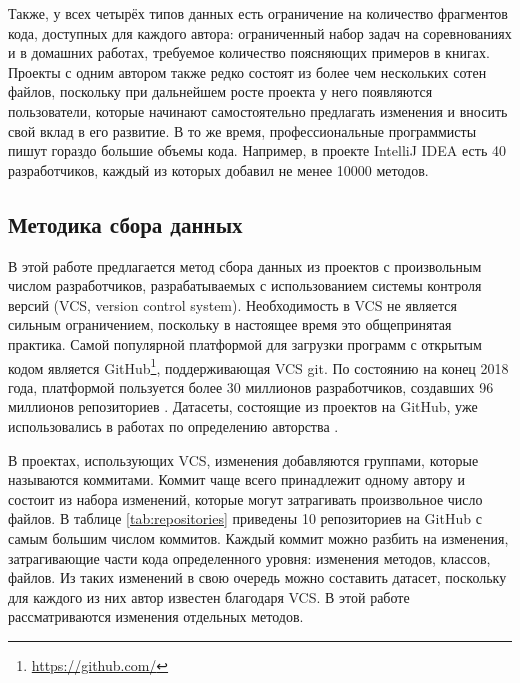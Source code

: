 Также, у всех четырёх типов данных есть ограничение на количество фрагментов кода, доступных для каждого автора: ограниченный набор задач на соревнованиях и в домашних работах, требуемое количество поясняющих примеров в книгах. Проекты с одним автором также редко состоят из более чем нескольких сотен файлов, поскольку при дальнейшем росте проекта у него появляются пользователи, которые начинают самостоятельно предлагать изменения и вносить свой вклад в его развитие. В то же время, профессиональные программисты пишут гораздо большие объемы кода. Например, в проекте IntelliJ IDEA есть 40 разработчиков, каждый из которых добавил не менее 10000 методов.

\subsection{Методика сбора данных}
В этой работе предлагается метод сбора данных из проектов с произвольным числом разработчиков, разрабатываемых с использованием системы контроля версий (VCS, version control system). Необходимость в VCS не является сильным ограничением, поскольку в настоящее время это общепринятая практика. Самой популярной платформой для загрузки программ с открытым кодом является GitHub\footnote{\url{https://github.com/}}, поддерживающая VCS git. По состоянию на конец 2018 года, платформой пользуется более 30 миллионов разработчиков, создавших 96 миллионов репозиториев \cite{GithubStats}. Датасеты, состоящие из проектов на GitHub, уже использовались в работах по определению авторства \cite{Wisse2015,Yang2017,Alsulami2017,Zhang2017}.

В проектах, использующих VCS, изменения добавляются группами, которые называются коммитами. Коммит чаще всего принадлежит одному автору и состоит из набора изменений, которые могут затрагивать произвольное число файлов. В таблице \ref{tab:repositories} приведены 10 репозиториев на GitHub с самым большим числом коммитов. Каждый коммит можно разбить на изменения, затрагивающие части кода определенного уровня: изменения методов, классов, файлов. Из таких изменений в свою очередь можно составить датасет, поскольку для каждого из них автор известен благодаря VCS. В этой работе рассматриваются изменения отдельных методов.

